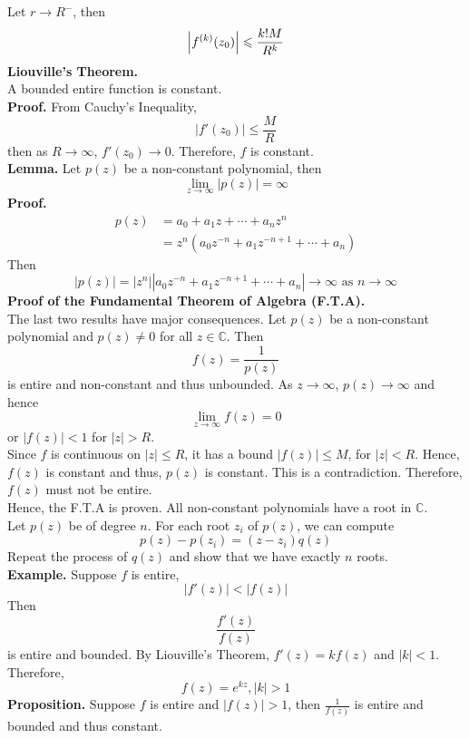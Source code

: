 \documentclass[11pt]{article}
\DeclarePairedDelimiter\abs{\lvert}{\rvert}
\begin{document}
Let $r \to R^-$, then 
$$\abs*{f^{(k)}(z_0)} \leqslant \frac{k!M}{R^k}$$
\newline
\textbf{Liouville's Theorem.}\\
A bounded entire function is constant. \\
\textbf{Proof.} From Cauchy's Inequality, 
$$|f'(z_0)| \leqslant \frac{M}{R}$$
then as $R \to \infty$, $f'(z_0) \to 0$. Therefore, $f$ is constant. \\
\newline
\textbf{Lemma.} Let $p(z)$ be a non-constant polynomial, then 
$$\lim_{z \to \infty} |p(z)| = \infty$$
\textbf{Proof.}
\begin{align*}
p(z) &= a_0 + a_1z + \cdots + a_nz^n\\
&= z^n(a_0z^{-n} + a_1z^{-n + 1} + \cdots + a_n)
\end{align*}
Then 
\begin{equation*}
|p(z)| = |z^n||a_0z^{-n} + a_1z^{-n + 1} + \cdots + a_n| \to \infty \mbox{ as } n \to \infty
\end{equation*}
\newline
\textbf{Proof of the Fundamental Theorem of Algebra (F.T.A).} \\
The last two results have major consequences. Let $p(z)$ be a non-constant polynomial and $p(z) \neq 0$ for all $z \in \mathbb{C}$. Then
$$f(z) = \frac{1}{p(z)}$$ 
is entire and non-constant and thus unbounded. 
As $z \to \infty$, $p(z) \to \infty$ and hence 
$$\lim_{z \to \infty} f(z) = 0$$ 
or $|f(z)| < 1$ for $|z| > R$. \\
Since $f$ is continuous on $|z| \leqslant R$, it has a bound $|f(z)| \leqslant M$, for $|z| < R$. Hence, $f(z)$ is constant and thus, $p(z)$ is constant. This is a contradiction. Therefore, $f(z)$ must not be entire. \\
Hence, the F.T.A is proven. All non-constant polynomials have a root in $\mathbb{C}$. \\
Let $p(z)$ be of degree $n$. For each root $z_i$ of $p(z)$, we can compute 
$$p(z) - p(z_i) = (z - z_i)q(z)$$
Repeat the process of $q(z)$ and show that we have exactly $n$ roots.\\
\newline
\textbf{Example.} Suppose $f$ is entire, 
$$|f'(z)| < |f(z)|$$ 
Then 
$$\frac{f'(z)}{f(z)} $$
is entire and bounded. By Liouville's Theorem, $f'(z) = kf(z)$ and $|k| < 1$. \\
Therefore, 
$$f(z) = e^{kz}, |k| > 1$$ 
\newline
\textbf{Proposition.} Suppose $f$ is entire and $|f(z)| > 1$, then $\frac{1}{f(z)}$ is entire and bounded and thus constant. \\
\end{document}
